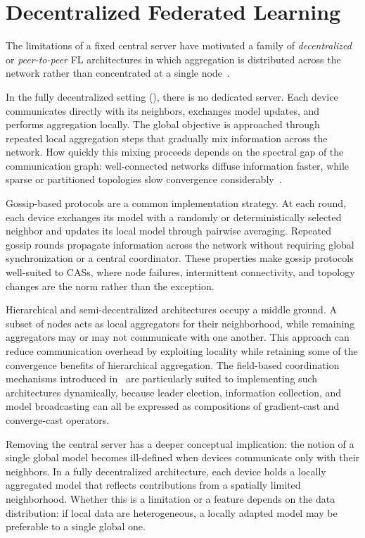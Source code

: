 \section{Decentralized Federated Learning}
\label{sec:fl-decentralized}

The limitations of a fixed central server have motivated
 a family of \emph{decentralized} or \emph{peer-to-peer} \gls{FL} architectures
 in which aggregation is distributed across the network
 rather than concentrated at a single node~\cite{DBLP:conf/dais/HegedusDJ19}.

In the fully decentralized setting (),
 there is no dedicated server.
%
Each device communicates directly with its neighbors,
 exchanges model updates, and performs aggregation locally.
%
The global objective is approached through repeated local aggregation steps
 that gradually mix information across the network.
%
How quickly this mixing proceeds depends on the spectral gap of the communication graph:
 well-connected networks diffuse information faster,
 while sparse or partitioned topologies slow convergence considerably~\cite{DBLP:conf/nips/LianZZHZL17}.

Gossip-based protocols are a common implementation strategy.
%
At each round, each device exchanges its model
 with a randomly or deterministically selected neighbor
 and updates its local model through pairwise averaging.
%
Repeated gossip rounds propagate information across the network
 without requiring global synchronization or a central coordinator.
%
These properties make gossip protocols well-suited to \glspl{CAS},
 where node failures, intermittent connectivity, and topology changes
 are the norm rather than the exception.

Hierarchical and semi-decentralized architectures occupy a middle ground.
%
A subset of nodes acts as local aggregators for their neighborhood,
 while remaining aggregators may or may not communicate with one another.
%
This approach can reduce communication overhead by exploiting locality
 while retaining some of the convergence benefits of hierarchical aggregation.
%
The field-based coordination mechanisms introduced in~
 are particularly suited to implementing such architectures dynamically,
 because leader election, information collection, and model broadcasting
 can all be expressed as compositions of gradient-cast and converge-cast operators.

Removing the central server has a deeper conceptual implication:
 the notion of a single global model becomes ill-defined
 when devices communicate only with their neighbors.
%
In a fully decentralized architecture,
 each device holds a locally aggregated model
 that reflects contributions from a spatially limited neighborhood.
%
Whether this is a limitation or a feature depends on the data distribution:
 if local data are heterogeneous, a locally adapted model may be preferable
 to a single global one.

